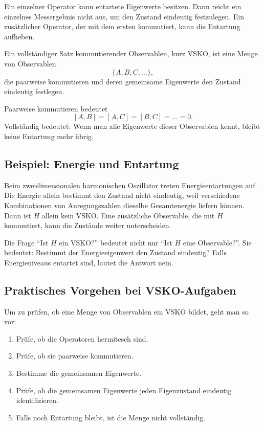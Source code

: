 Ein einzelner Operator kann entartete Eigenwerte besitzen. Dann reicht ein einzelnes Messergebnis nicht aus, um den Zustand eindeutig festzulegen. Ein zusätzlicher Operator, der mit dem ersten kommutiert, kann die Entartung aufheben.

\begin{definitionbox}
Ein vollständiger Satz kommutierender Observablen, kurz VSKO, ist eine Menge von Observablen
\[
    \{A,B,C,\dots\},
\]
die paarweise kommutieren und deren gemeinsame Eigenwerte den Zustand eindeutig festlegen.
\end{definitionbox}

Paarweise kommutieren bedeutet
\[
    [A,B]=[A,C]=[B,C]=\dots=0.
\]
Vollständig bedeutet: Wenn man alle Eigenwerte dieser Observablen kennt, bleibt keine Entartung mehr übrig.

\subsection{Beispiel: Energie und Entartung}

Beim zweidimensionalen harmonischen Oszillator treten Energieentartungen auf. Die Energie allein bestimmt den Zustand nicht eindeutig, weil verschiedene Kombinationen von Anregungszahlen dieselbe Gesamtenergie liefern können. Dann ist $H$ allein kein VSKO. Eine zusätzliche Observable, die mit $H$ kommutiert, kann die Zustände weiter unterscheiden.

\begin{notebox}
Die Frage \enquote{Ist $H$ ein VSKO?} bedeutet nicht nur \enquote{Ist $H$ eine Observable?}. Sie bedeutet: Bestimmt der Energieeigenwert den Zustand eindeutig? Falls Energieniveaus entartet sind, lautet die Antwort nein.
\end{notebox}

\subsection{Praktisches Vorgehen bei VSKO-Aufgaben}

Um zu prüfen, ob eine Menge von Observablen ein VSKO bildet, geht man so vor:
\begin{enumerate}
    \item Prüfe, ob die Operatoren hermitesch sind.
    \item Prüfe, ob sie paarweise kommutieren.
    \item Bestimme die gemeinsamen Eigenwerte.
    \item Prüfe, ob die gemeinsamen Eigenwerte jeden Eigenzustand eindeutig identifizieren.
    \item Falls noch Entartung bleibt, ist die Menge nicht vollständig.
\end{enumerate}

